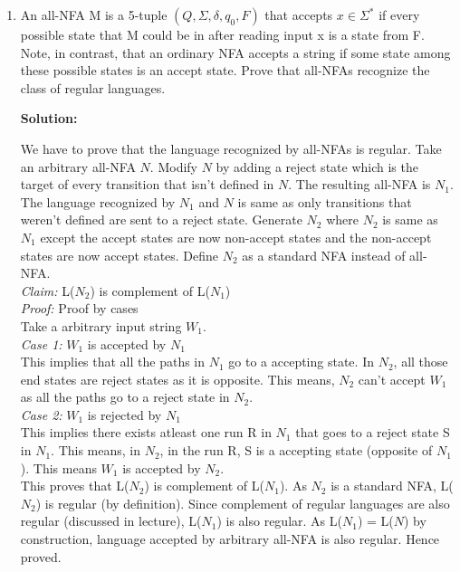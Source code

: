 \documentclass[11pt]{article}
\begin{document}
\begin{enumerate}[1.]
    \item An all-NFA M is a 5-tuple $(Q, \Sigma, \delta, q_0, F)$ that accepts $x \in \Sigma^*$ if every possible state that M could be in after reading input x is a state from F. Note, in contrast, that an ordinary NFA accepts a string if some state among these possible states is an accept state. Prove that all-NFAs recognize the class of regular languages.
    
    \clearpage
    \textbf{Solution:}
    
    We have to prove that the language recognized by all-NFAs is regular. Take an arbitrary all-NFA $N$. Modify $N$ by adding a reject state which is the target of every transition that isn't defined in $N$. The resulting all-NFA is $N_1$. The language recognized by $N_1$ and $N$ is same as only transitions that weren't defined are sent to a reject state. Generate $N_2$ where $N_2$ is same as $N_1$ except the accept states are now non-accept states and the non-accept states are now accept states. Define $N_2$ as a standard NFA instead of all-NFA. \\
    
    \textit{Claim:} L($N_2$) is complement of L($N_1$)\\
    \textit{Proof:} Proof by cases\\
    Take a arbitrary input string $W_1$.\\
    \textit{Case 1:} $W_1$ is accepted by $N_1$\\
    This implies that all the paths in $N_1$ go to a accepting state. In $N_2$, all those end states are reject states as it is opposite. This means, $N_2$ can't accept $W_1$ as all the paths go to a reject state in $N_2$.\\
    
    \textit{Case 2:} $W_1$ is rejected by $N_1$\\
    This implies there exists atleast one run R in $N_1$ that goes to a reject state S in $N_1$. This means, in $N_2$, in the run R, S is a accepting state (opposite of $N_1$). This means $W_1$ is accepted by $N_2$.\\
    
    This proves that L($N_2$) is complement of L($N_1$). As $N_2$ is a standard NFA, L($N_2$) is regular (by definition). Since complement of regular languages are also regular (discussed in lecture), L($N_1$) is also regular. As L($N_1$) = L($N$) by construction, language accepted by arbitrary all-NFA is also regular. Hence proved. 
    

\end{enumerate}
\end{document}
